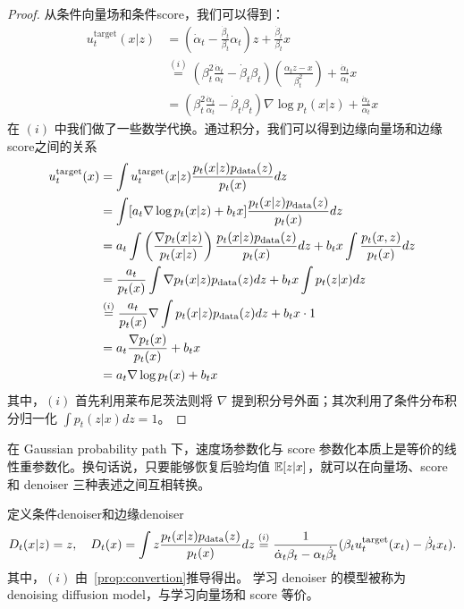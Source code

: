 \begin{proof}
从条件向量场和条件score，我们可以得到：
\begin{equation}
\begin{aligned}
u_t^{\mathrm{target}}(x|z) &= \left( \dot{\alpha}_t - \frac{\dot{\beta}_t}{\beta_t} \alpha_t \right) z + \frac{\dot{\beta}_t}{\beta_t} x \\
&\stackrel{(i)}{=} \left( \beta_t^2 \frac{\dot{\alpha}_t}{\alpha_t} - \dot{\beta}_t \beta_t \right) \left( \frac{\alpha_t z - x}{\beta_t^2} \right) + \frac{\dot{\alpha}_t}{\alpha_t} x \\
&= \left( \beta_t^2 \frac{\dot{\alpha}_t}{\alpha_t} - \dot{\beta}_t \beta_t \right) \nabla \log p_t(x|z) + \frac{\dot{\alpha}_t}{\alpha_t} x
\end{aligned}
\end{equation}
在 $(i)$ 中我们做了一些数学代换。通过积分，我们可以得到边缘向量场和边缘score之间的关系
\begin{equation}
\begin{aligned}
u_t^{\mathrm{target}}(x) &= \int u_t^{\mathrm{target}}(x|z) \frac{p_t(x|z)p_{\mathrm{data}}(z)}{p_t(x)} dz \\
&= \int [a_t \nabla \log p_t(x|z) + b_t x] \frac{p_t(x|z)p_{\mathrm{data}}(z)}{p_t(x)} dz \\
&= a_t \int \left( \frac{\nabla p_t(x|z)}{p_t(x|z)} \right) \frac{p_t(x|z)p_{\mathrm{data}}(z)}{p_t(x)} dz + b_t x \int \frac{p_t(x, z)}{p_t(x)} dz \\
&= \frac{a_t}{p_t(x)} \int \nabla p_t(x|z) p_{\mathrm{data}}(z) dz + b_t x \int p_t(z|x) dz \\
&\stackrel{(i)}{=} \frac{a_t}{p_t(x)} \nabla \int p_t(x|z) p_{\mathrm{data}}(z) dz + b_t x \cdot 1 \\
&= a_t \frac{\nabla p_t(x)}{p_t(x)} + b_t x \\
&= a_t \nabla \log p_t(x) + b_t x
\end{aligned}
\end{equation}
其中，$(i)$ 首先利用莱布尼茨法则将 $\nabla$ 提到积分号外面；其次利用了条件分布积分归一化 $\int p_t(z|x) dz = 1$。
\end{proof}

\begin{remark}
在 Gaussian probability path 下，速度场参数化与 score 参数化本质上是等价的线性重参数化。换句话说，只要能够恢复后验均值 $\mathbb{E}[z|x]$，就可以在向量场、score 和 denoiser 三种表述之间互相转换。

定义条件denoiser和边缘denoiser
\begin{equation}
D_t(x|z) = z, \quad D_t(x) = \int z \frac{p_t(x|z) p_{\mathrm{data}}(z)}{p_t(x)} dz \stackrel{(i)}{=} \frac{1}{\dot{\alpha}_t \beta_t - \alpha_t \dot{\beta}_t} (\beta_t u_t^{\mathrm{target}}(x_t) - \dot{\beta}_t x_t).
\end{equation}
其中，$(i)$ 由~\ref{prop:convertion}推导得出。
学习 denoiser 的模型被称为 denoising diffusion model，与学习向量场和 score 等价。
\end{remark}

